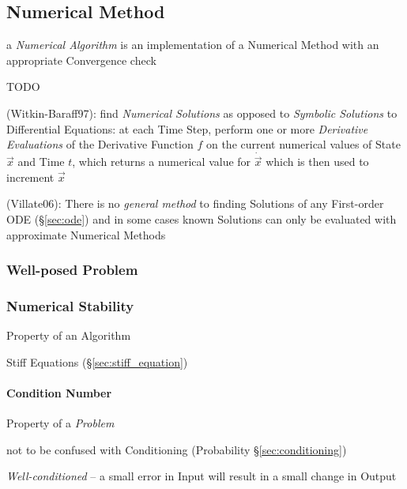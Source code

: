 \subsection{Numerical Method}\label{sec:numerical_method}

a \emph{Numerical Algorithm} is an implementation of a Numerical Method with an
appropriate Convergence check

TODO

(Witkin-Baraff97): find \emph{Numerical Solutions} as opposed to \emph{Symbolic
  Solutions} to Differential Equations: at each Time Step, perform one or more
\emph{Derivative Evaluations} of the Derivative Function $f$ on the current
numerical values of State $\vec{x}$ and Time $t$, which returns a numerical
value for $\dot{\vec{x}}$ which is then used to increment $\vec{x}$

(Villate06): There is no \emph{general method} to finding Solutions of any
First-order ODE (\S\ref{sec:ode}) and in some cases known Solutions can only be
evaluated with approximate Numerical Methods



\subsubsection{Well-posed Problem}\label{sec:well_posed}

\subsubsection{Numerical Stability}\label{sec:numerical_stability}

Property of an Algorithm

Stiff Equations (\S\ref{sec:stiff_equation})



\paragraph{Condition Number}\label{sec:condition_number}\hfill

Property of a \emph{Problem}

\fist not to be confused with Conditioning (Probability
\S\ref{sec:conditioning})

\emph{Well-conditioned} -- a small error in Input will result in a small change
in Output

